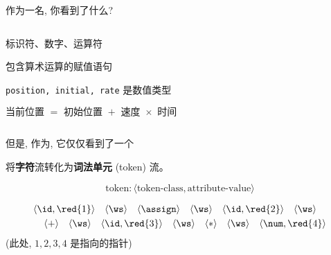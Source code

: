 \begin{frame}{}

  \begin{center}
    作为一名, 你看到了什么?

    \vspace{0.50cm}
    \begin{columns}
        \begin{description}
          \setlength{\itemsep}{12pt}
          \pause
          \item[词法:] 标识符、数字、运算符
          \pause
          \item[语法:] 包含算术运算的赋值语句
          \pause
          \item[语义:] \texttt{position, initial, rate} 是数值类型
          \pause
          \item[物理定律:] $\text{当前位置 } = \text{ 初始位置 } + \text{ 速度 } \times \text{ 时间}$
        \end{description}
    \end{columns}

    \pause
    \vspace{1.00cm}
    但是, 作为, 它仅仅看到了一个
  \end{center}
\end{frame}

\begin{frame}{}
  \begin{center}
     将{\bf 字符}流转化为{\bf 词法单元} (token) 流。

    \[
      \boxed{\text{token}: \langle \text{token-class}, \text{attribute-value} \rangle}
    \]


    \begin{align*}
      \langle \id, \red{1} \rangle \quad
      \langle \ws \rangle \quad
      \langle \assign \rangle \quad
      \langle \ws \rangle \quad
      \langle \id, \red{2} \rangle \quad
      \langle \ws \rangle \quad \\
      \langle + \rangle \quad
      \langle \ws \rangle \quad
      \langle \id, \red{3} \rangle \quad
      \langle \ws \rangle \quad
      \langle \ast \rangle \quad
      \langle \ws \rangle \quad
      \langle \num, \red{4} \rangle
    \end{align*}
    (此处, $1, 2, 3, 4$ 是指向的指针)
  \end{center}
\end{frame}

